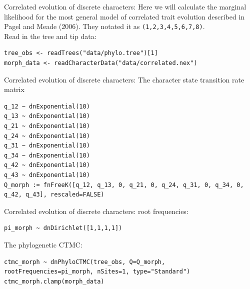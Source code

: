 \documentclass[mathserif]{beamer}
\begin{document}
\begin{frame}[fragile]
    \begin{block}{Correlated evolution of discrete characters:}
    \bigskip
        Here we will calculate the marginal likelihood for the most general model of correlated trait evolution 
        described in Pagel and Meade (2006). They notated it as \texttt{(1,2,3,4,5,6,7,8)}.\\
    \bigskip
    Read in the tree and tip data:\\
    \bigskip
    \begin{lstlisting}
tree_obs <- readTrees("data/phylo.tree")[1]
morph_data <- readCharacterData("data/correlated.nex")
    \end{lstlisting}
    \end{block}
\end{frame}


\begin{frame}[fragile]
    \begin{block}{Correlated evolution of discrete characters:}
    \bigskip
The character state transition rate matrix\\
    \bigskip
    \begin{lstlisting}
q_12 ~ dnExponential(10)
q_13 ~ dnExponential(10)
q_21 ~ dnExponential(10)
q_24 ~ dnExponential(10)
q_31 ~ dnExponential(10)
q_34 ~ dnExponential(10)
q_42 ~ dnExponential(10)
q_43 ~ dnExponential(10)
Q_morph := fnFreeK([q_12, q_13, 0, q_21, 0, q_24, q_31, 0, q_34, 0, q_42, q_43], rescaled=FALSE)
    \end{lstlisting}
    \end{block}
\end{frame}


\begin{frame}[fragile]
    \begin{block}{Correlated evolution of discrete characters:}
    \bigskip
 root frequencies:
    \bigskip
    \begin{lstlisting}
pi_morph ~ dnDirichlet([1,1,1,1])
    \end{lstlisting}
    \bigskip
The phylogenetic CTMC:
    \bigskip
    \begin{lstlisting}
ctmc_morph ~ dnPhyloCTMC(tree_obs, Q=Q_morph, rootFrequencies=pi_morph, nSites=1, type="Standard")
ctmc_morph.clamp(morph_data)
    \end{lstlisting}
    \end{block}
\end{frame}
\end{document}
